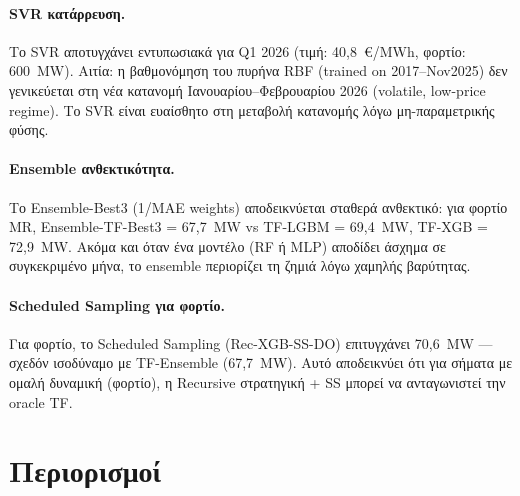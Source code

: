 \paragraph{SVR κατάρρευση.}
Το SVR αποτυγχάνει εντυπωσιακά για Q1 2026 (τιμή: 40,8~€/MWh, φορτίο: 600~MW).
Αιτία: η βαθμονόμηση του πυρήνα RBF (trained on 2017--Nov2025) δεν γενικεύεται
στη νέα κατανομή Ιανουαρίου--Φεβρουαρίου 2026 (volatile, low-price regime).
Το SVR είναι ευαίσθητο στη μεταβολή κατανομής λόγω μη-παραμετρικής φύσης.

\paragraph{Ensemble ανθεκτικότητα.}
Το Ensemble-Best3 (1/MAE weights) αποδεικνύεται σταθερά ανθεκτικό: για φορτίο
MR, Ensemble-TF-Best3 = 67,7~MW vs TF-LGBM = 69,4~MW, TF-XGB = 72,9~MW.
Ακόμα και όταν ένα μοντέλο (RF ή MLP) αποδίδει άσχημα σε συγκεκριμένο μήνα,
το ensemble περιορίζει τη ζημιά λόγω χαμηλής βαρύτητας.

\paragraph{Scheduled Sampling για φορτίο.}
Για φορτίο, το Scheduled Sampling (Rec-XGB-SS-DO) επιτυγχάνει 70,6~MW — σχεδόν
ισοδύναμο με TF-Ensemble (67,7~MW). Αυτό αποδεικνύει ότι για σήματα με ομαλή
δυναμική (φορτίο), η Recursive στρατηγική + SS μπορεί να ανταγωνιστεί την
oracle TF.

\section{Περιορισμοί}
\label{sec:conc_limitations}

